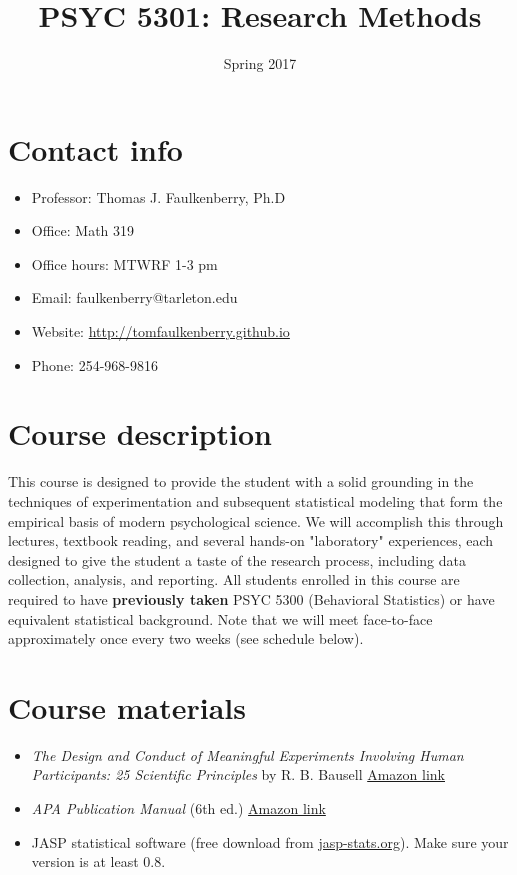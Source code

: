 \documentclass[10pt]{article}
\date{Spring 2017}
\title{PSYC 5301: Research Methods}
\begin{document}
\maketitle

\section*{Contact info}
\label{sec-1}
\begin{itemize}
\item Professor: Thomas J. Faulkenberry, Ph.D
\item Office: Math 319
\item Office hours: MTWRF 1-3 pm
\item Email: faulkenberry@tarleton.edu
\item Website: \url{http://tomfaulkenberry.github.io}
\item Phone: 254-968-9816
\end{itemize}

\section*{Course description}
\label{sec-2}

This course is designed to provide the student with a solid grounding in
the techniques of experimentation and subsequent statistical modeling that
form the empirical basis of modern psychological science.  We will 
accomplish this through lectures, textbook reading, and several hands-on
"laboratory" experiences, each designed to give the student a taste of the
research process, including data collection, analysis, and reporting.
All students enrolled in this course are required to have 
\textbf{previously taken} PSYC 5300 (Behavioral Statistics) or have equivalent
statistical background.  Note that we will meet face-to-face approximately 
once every two weeks (see schedule below). 

\section*{Course materials}
\label{sec-3}

\begin{itemize}
\item \emph{The Design and Conduct of Meaningful Experiments Involving Human Participants: 25 Scientific Principles} by R. B. Bausell \href{https://www.amazon.com/Conduct-Meaningful-Experiments-Involving-Participants/dp/0199385238}{Amazon link}
\item \emph{APA Publication Manual} (6th ed.) \href{http://www.amazon.com/Publication-Manual-American-Psychological-Association/dp/1433805618/}{Amazon link}
\item JASP statistical software (free download from \href{http://jasp-stats.org}{jasp-stats.org}).  Make sure your version is at least 0.8.
\end{itemize}
\end{document}
